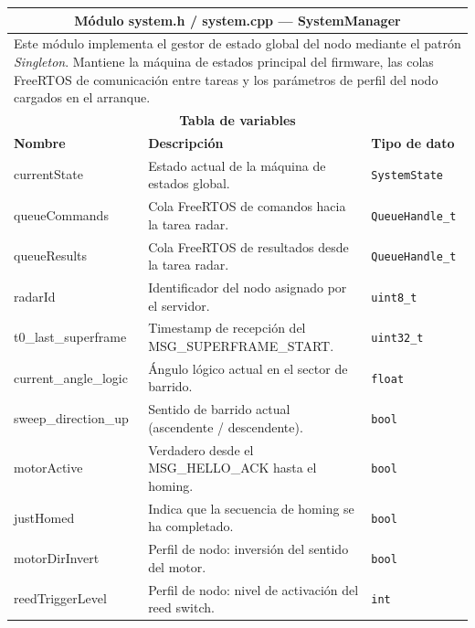\begin{table}[h!]
\centering
\small
\renewcommand{\arraystretch}{1.25}
\begin{tabular}{|p{2.8cm}|p{5.5cm}|p{2.8cm}|p{1.7cm}|}
\hline
\multicolumn{4}{|c|}{\textbf{Módulo system.h / system.cpp — SystemManager}} \\
\hline
\multicolumn{4}{|p{12.8cm}|}{Este módulo implementa el gestor de estado global
del nodo mediante el patrón \textit{Singleton}. Mantiene la máquina de estados
principal del firmware, las colas FreeRTOS de comunicación entre tareas y los
parámetros de perfil del nodo cargados en el arranque.} \\
\hline
\multicolumn{4}{|c|}{\textbf{Tabla de variables}} \\
\hline
\textbf{Nombre} & \textbf{Descripción} & \multicolumn{2}{l|}{\textbf{Tipo de dato}} \\
\hline
currentState & Estado actual de la máquina de estados global. & \multicolumn{2}{l|}{\texttt{SystemState}} \\
\hline
queueCommands & Cola FreeRTOS de comandos hacia la tarea radar. & \multicolumn{2}{l|}{\texttt{QueueHandle\_t}} \\
\hline
queueResults & Cola FreeRTOS de resultados desde la tarea radar. & \multicolumn{2}{l|}{\texttt{QueueHandle\_t}} \\
\hline
radarId & Identificador del nodo asignado por el servidor. & \multicolumn{2}{l|}{\texttt{uint8\_t}} \\
\hline
t0\_last\_superframe & Timestamp de recepción del MSG\_SUPERFRAME\_START. & \multicolumn{2}{l|}{\texttt{uint32\_t}} \\
\hline
current\_angle\_logic & Ángulo lógico actual en el sector de barrido. & \multicolumn{2}{l|}{\texttt{float}} \\
\hline
sweep\_direction\_up & Sentido de barrido actual (ascendente / descendente). & \multicolumn{2}{l|}{\texttt{bool}} \\
\hline
motorActive & Verdadero desde el MSG\_HELLO\_ACK hasta el homing. & \multicolumn{2}{l|}{\texttt{bool}} \\
\hline
justHomed & Indica que la secuencia de homing se ha completado. & \multicolumn{2}{l|}{\texttt{bool}} \\
\hline
motorDirInvert & Perfil de nodo: inversión del sentido del motor. & \multicolumn{2}{l|}{\texttt{bool}} \\
\hline
reedTriggerLevel & Perfil de nodo: nivel de activación del reed switch. & \multicolumn{2}{l|}{\texttt{int}} \\

\end{tabular}
\end{table}
